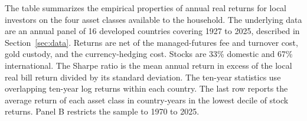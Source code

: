 \begin{table}[p]\centering
\caption{Empirical properties of real returns on the four asset classes}\label{tab:sleeves}
\begin{minipage}{\linewidth}\small The table summarizes the empirical properties of annual real returns for local investors on the four asset classes available to the household. The underlying data are an annual panel of 16 developed countries covering 1927 to 2025, described in Section~\ref{sec:data}. Returns are net of the managed-futures fee and turnover cost, gold custody, and the currency-hedging cost. Stocks are 33\% domestic and 67\% international. The Sharpe ratio is the mean annual return in excess of the local real bill return divided by its standard deviation. The ten-year statistics use overlapping ten-year log returns within each country. The last row reports the average return of each asset class in country-years in the lowest decile of stock returns. Panel B restricts the sample to 1970 to 2025.\end{minipage}
\medskip


\end{table}
